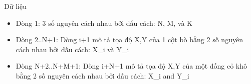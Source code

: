 Dữ liệu  
\begin{itemize}
	\item     Dòng 1: 3 số nguyên cách nhau bởi dấu cách: N, M, và K   
	\item     Dòng 2..N+1: Dòng i+1 mô tả tọa độ X,Y của 1 cột bò         bằng 2 số nguyên cách nhau bởi dấu cách: X\_i và Y\_i   
	\item     Dòng N+2..N+M+1: Dòng i+N+1 mô tả tọa độ X,Y của một         đống cỏ khô bằng 2 số nguyên cách nhau bởi dấu cách: X\_i and Y\_i   
\end{itemize}